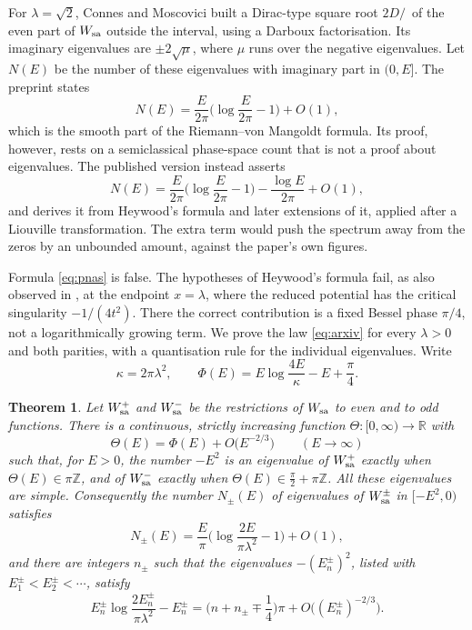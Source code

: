 \documentclass[11pt]{amsart}
\newtheorem{mainthm}{Theorem}
\theoremstyle{definition}
\newcommand{\RR}{\mathbb{R}}
\newcommand{\ZZ}{\mathbb{Z}}
\newcommand{\Dslash}{D\!\!\!\!/\,}
\begin{document}
For $\lambda=\sqrt2$, Connes and Moscovici built a Dirac-type square root $2\Dslash$ of the even part of $W_{\rm sa}$ outside the interval, using a Darboux factorisation. Its imaginary eigenvalues are $\pm 2\sqrt{\mu}$, where $\mu$ runs over the negative eigenvalues. Let $N(E)$ be the number of these eigenvalues with imaginary part in $(0,E]$. The preprint \cite[Thm.~6.1]{CM21} states
\begin{equation}\label{eq:arxiv}
N(E)=\frac{E}{2\pi}\Big(\log\frac{E}{2\pi}-1\Big)+O(1),
\end{equation}
which is the smooth part of the Riemann--von Mangoldt formula. Its proof, however, rests on a semiclassical phase-space count \cite[Prop.~4.2]{CM21} that is not a proof about eigenvalues. The published version \cite[Thm.~5.1, Eq.~(33)]{CM22} instead asserts
\begin{equation}\label{eq:pnas}
N(E)=\frac{E}{2\pi}\Big(\log\frac{E}{2\pi}-1\Big)-\frac{\log E}{2\pi}+O(1),
\end{equation}
and derives it from Heywood's formula \cite{Hey54} and later extensions of it, applied after a Liouville transformation. The extra term would push the spectrum away from the zeros by an unbounded amount, against the paper's own figures.

Formula \eqref{eq:pnas} is false. The hypotheses of Heywood's formula fail, as also observed in \cite{TWW26}, at the endpoint $x=\lambda$, where the reduced potential has the critical singularity $-1/(4t^2)$. There the correct contribution is a fixed Bessel phase $\pi/4$, not a logarithmically growing term. We prove the law \eqref{eq:arxiv} for every $\lambda>0$ and both parities, with a quantisation rule for the individual eigenvalues. Write
\begin{equation}\label{eq:kappa}
\kappa=2\pi\lambda^2,\qquad \Phi(E)=E\log\frac{4E}{\kappa}-E+\frac{\pi}{4}.
\end{equation}

\begin{mainthm}\label{thm:A}
Let $W_{\rm sa}^{+}$ and $W_{\rm sa}^{-}$ be the restrictions of $W_{\rm sa}$ to even and to odd functions. There is a continuous, strictly increasing function $\Theta:[0,\infty)\to\RR$ with
\[
\Theta(E)=\Phi(E)+O\big(E^{-2/3}\big)\qquad(E\to\infty)
\]
such that, for $E>0$, the number $-E^2$ is an eigenvalue of $W_{\rm sa}^{+}$ exactly when $\Theta(E)\in\pi\ZZ$, and of $W_{\rm sa}^{-}$ exactly when $\Theta(E)\in\frac{\pi}{2}+\pi\ZZ$. All these eigenvalues are simple. Consequently the number $N_\pm(E)$ of eigenvalues of $W_{\rm sa}^{\pm}$ in $[-E^2,0)$ satisfies
\[
N_\pm(E)=\frac{E}{\pi}\Big(\log\frac{2E}{\pi\lambda^2}-1\Big)+O(1),
\]
and there are integers $n_\pm$ such that the eigenvalues $-(E_n^\pm)^2$, listed with $E_1^\pm<E_2^\pm<\cdots$, satisfy
\[
E_n^{\pm}\log\frac{2E_n^\pm}{\pi\lambda^2}-E_n^\pm=\Big(n+n_\pm\mp\frac14\Big)\pi+O\big((E_n^\pm)^{-2/3}\big).
\]
\end{mainthm}
\end{document}
